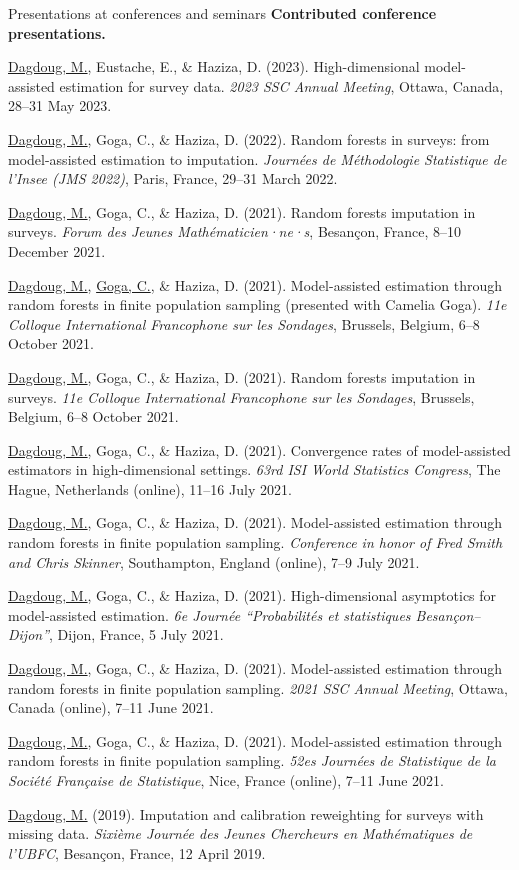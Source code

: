 \documentclass{resume}
\begin{document}
\begin{rSection}{Presentations at conferences and seminars}
\textbf{Contributed conference presentations.}
\begin{etaremune}
  \item \underline{Dagdoug, M.}, Eustache, E., \& Haziza, D. (2023). High-dimensional model-assisted estimation for survey data. \textit{2023 SSC Annual Meeting}, Ottawa, Canada, 28--31 May 2023.
  \item \underline{Dagdoug, M.}, Goga, C., \& Haziza, D. (2022). Random forests in surveys: from model-assisted estimation to imputation. \textit{Journées de Méthodologie Statistique de l'Insee (JMS 2022)}, Paris, France, 29--31 March 2022.
  \item \underline{Dagdoug, M.}, Goga, C., \& Haziza, D. (2021). Random forests imputation in surveys. \textit{Forum des Jeunes Mathématicien·ne·s}, Besançon, France, 8--10 December 2021.
  \item \underline{Dagdoug, M.}, \underline{Goga, C.}, \& Haziza, D. (2021). Model-assisted estimation through random forests in finite population sampling (presented with Camelia Goga). \textit{11e Colloque International Francophone sur les Sondages}, Brussels, Belgium, 6--8 October 2021.
  \item \underline{Dagdoug, M.}, Goga, C., \& Haziza, D. (2021). Random forests imputation in surveys. \textit{11e Colloque International Francophone sur les Sondages}, Brussels, Belgium, 6--8 October 2021.
  \item \underline{Dagdoug, M.}, Goga, C., \& Haziza, D. (2021). Convergence rates of model-assisted estimators in high-dimensional settings. \textit{63rd ISI World Statistics Congress}, The Hague, Netherlands (online), 11--16 July 2021.
  \item \underline{Dagdoug, M.}, Goga, C., \& Haziza, D. (2021). Model-assisted estimation through random forests in finite population sampling. \textit{Conference in honor of Fred Smith and Chris Skinner}, Southampton, England (online), 7--9 July 2021.
  \item \underline{Dagdoug, M.}, Goga, C., \& Haziza, D. (2021). High-dimensional asymptotics for model-assisted estimation. \textit{6e Journée ``Probabilités et statistiques Besançon--Dijon''}, Dijon, France, 5 July 2021.
  \item \underline{Dagdoug, M.}, Goga, C., \& Haziza, D. (2021). Model-assisted estimation through random forests in finite population sampling. \textit{2021 SSC Annual Meeting}, Ottawa, Canada (online), 7--11 June 2021.
  \item \underline{Dagdoug, M.}, Goga, C., \& Haziza, D. (2021). Model-assisted estimation through random forests in finite population sampling. \textit{52es Journées de Statistique de la Société Française de Statistique}, Nice, France (online), 7--11 June 2021.
  \item \underline{Dagdoug, M.} (2019). Imputation and calibration reweighting for surveys with missing data. \textit{Sixième Journée des Jeunes Chercheurs en Mathématiques de l'UBFC}, Besançon, France, 12 April 2019.
\end{etaremune}


\end{rSection}
\end{document}
